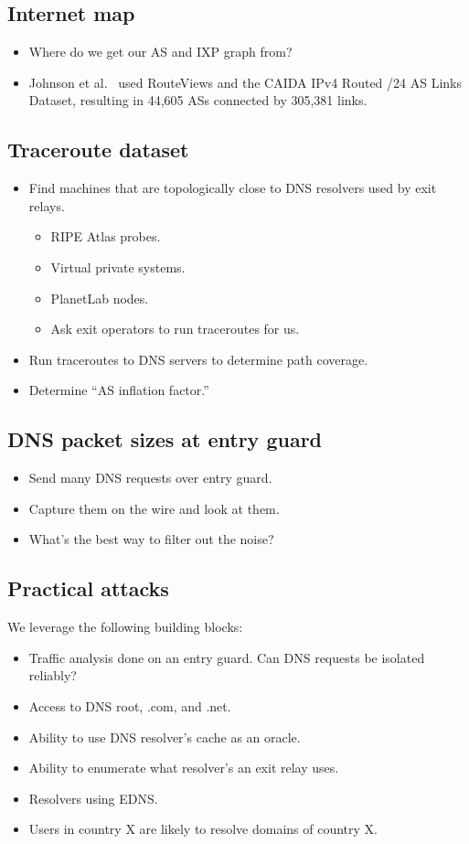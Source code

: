 \subsection{Internet map}
\begin{itemize}
	\item Where do we get our AS and IXP graph from?
	\item Johnson et al.~\cite[\S 5.2]{Johnson2013a} used RouteViews and the CAIDA IPv4
		Routed /24 AS Links Dataset, resulting in 44,605 ASs connected by
		305,381 links.
\end{itemize}

\subsection{Traceroute dataset}
\label{sec:traceroute-dataset}
\begin{itemize}
	\item Find machines that are topologically close to DNS resolvers
		used by exit relays.
	\begin{itemize}
		\item RIPE Atlas probes.
		\item Virtual private systems.
		\item PlanetLab nodes.
		\item Ask exit operators to run traceroutes for us.
	\end{itemize}
	\item Run traceroutes to DNS servers to determine path coverage.
	\item Determine ``AS inflation factor.''
\end{itemize}

\subsection{DNS packet sizes at entry guard}
\begin{itemize}
	\item Send many DNS requests over entry guard.
	\item Capture them on the wire and look at them.
	\item What's the best way to filter out the noise?
\end{itemize}

\subsection{Practical attacks}
We leverage the following building blocks:
\begin{itemize}
	\item Traffic analysis done on an entry guard.  Can DNS requests be isolated
		reliably?
	\item Access to DNS root, .com, and .net.
	\item Ability to use DNS resolver's cache as an oracle.
	\item Ability to enumerate what resolver's an exit relay uses.
	\item Resolvers using EDNS.
	\item Users in country X are likely to resolve domains of country X.
\end{itemize}
